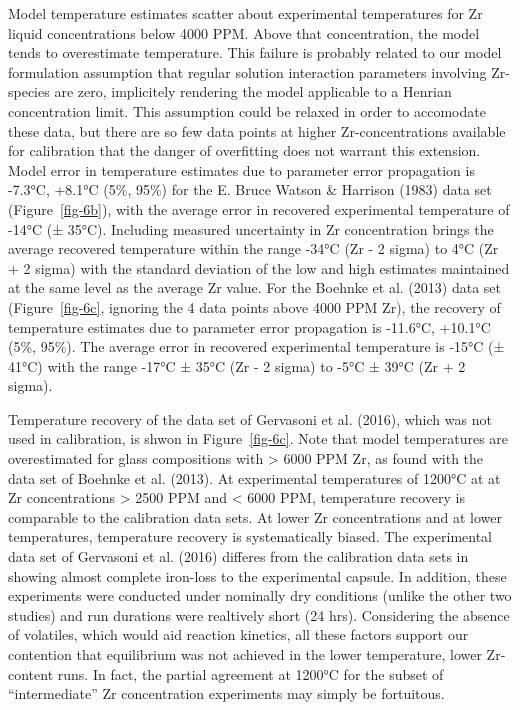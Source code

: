 \documentclass[
]{agujournal2019}
\begin{document}
Model temperature estimates scatter about experimental temperatures for
Zr liquid concentrations below 4000 PPM. Above that concentration, the
model tends to overestimate temperature. This failure is probably
related to our model formulation assumption that regular solution
interaction parameters involving Zr-species are zero, implicitely
rendering the model applicable to a Henrian concentration limit. This
assumption could be relaxed in order to accomodate these data, but there
are so few data points at higher Zr-concentrations available for
calibration that the danger of overfitting does not warrant this
extension. Model error in temperature estimates due to parameter error
propagation is -7.3°C, +8.1°C (5\%, 95\%) for the E. Bruce Watson \&
Harrison (1983) data set (Figure~\ref{fig-6b}), with the average error
in recovered experimental temperature of -14°C (± 35°C). Including
measured uncertainty in Zr concentration brings the average recovered
temperature within the range -34°C (Zr - 2 sigma) to 4°C (Zr + 2 sigma)
with the standard deviation of the low and high estimates maintained at
the same level as the average Zr value. For the Boehnke et al. (2013)
data set (Figure~\ref{fig-6c}, ignoring the 4 data points above 4000 PPM
Zr), the recovery of temperature estimates due to parameter error
propagation is -11.6°C, +10.1°C (5\%, 95\%). The average error in
recovered experimental temperature is -15°C (± 41°C) with the range
-17°C ± 35°C (Zr - 2 sigma) to -5°C ± 39°C (Zr + 2 sigma).

Temperature recovery of the data set of Gervasoni et al. (2016), which
was not used in calibration, is shwon in Figure~\ref{fig-6c}. Note that
model temperatures are overestimated for glass compositions with
\textgreater{} 6000 PPM Zr, as found with the data set of Boehnke et al.
(2013). At experimental temperatures of 1200°C at at Zr concentrations
\textgreater{} 2500 PPM and \textless{} 6000 PPM, temperature recovery
is comparable to the calibration data sets. At lower Zr concentrations
and at lower temperatures, temperature recovery is systematically
biased. The experimental data set of Gervasoni et al. (2016) differes
from the calibration data sets in showing almost complete iron-loss to
the experimental capsule. In addition, these experiments were conducted
under nominally dry conditions (unlike the other two studies) and run
durations were realtively short (24 hrs). Considering the absence of
volatiles, which would aid reaction kinetics, all these factors support
our contention that equilibrium was not achieved in the lower
temperature, lower Zr-content runs. In fact, the partial agreement at
1200°C for the subset of ``intermediate'' Zr concentration experiments
may simply be fortuitous.
\end{document}
